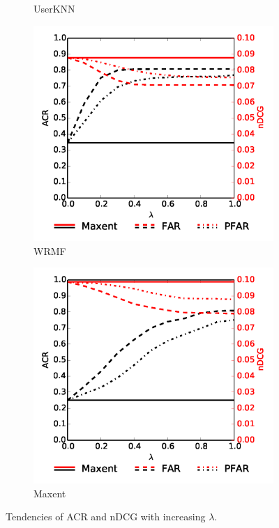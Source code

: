 \begin{figure}[!htb]
\begin{subfigure}{0.49\columnwidth}
		\caption{UserKNN \cite{resnick1997recommender}} %
	\end{subfigure}
	\begin{subfigure}{0.49\columnwidth} %
		\includegraphics[width=\textwidth]{imgs/far/wrmf.png}
		\caption{WRMF \cite{hu2008collaborative}} %
	\end{subfigure}
	\begin{subfigure}{0.49\columnwidth} %
		\includegraphics[width=\textwidth]{imgs/far/maxent.png}
		\caption{Maxent \cite{choo2014gather}} %
	\end{subfigure}
	\caption{Tendencies of ACR and nDCG with increasing $\lambda$.\label{fig:kiva_results}} %
\end{figure}


